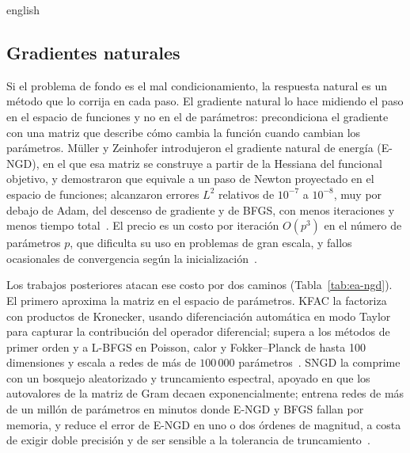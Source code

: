 \documentclass[../0000.tex]{subfiles}
\begin{document}
\begin{hyphenrules}{english}
\subsection{Gradientes naturales}
\label{subsec:ea-ngd}

Si el problema de fondo es el mal condicionamiento, la respuesta natural es un método que lo corrija en cada paso. El gradiente natural lo hace midiendo el paso en el espacio de funciones y no en el de parámetros: precondiciona el gradiente con una matriz que describe cómo cambia la función cuando cambian los parámetros. Müller y Zeinhofer introdujeron el gradiente natural de energía (E-NGD), en el que esa matriz se construye a partir de la Hessiana del funcional objetivo, y demostraron que equivale a un paso de Newton proyectado en el espacio de funciones; alcanzaron errores $L^2$ relativos de $10^{-7}$ a $10^{-8}$, muy por debajo de Adam, del descenso de gradiente y de BFGS, con menos iteraciones y menos tiempo total~\cite{muller2023achieving}. El precio es un costo por iteración $O(p^3)$ en el número de parámetros $p$, que dificulta su uso en problemas de gran escala, y fallos ocasionales de convergencia según la inicialización~\cite{muller2023achieving}.

Los trabajos posteriores atacan ese costo por dos caminos (Tabla~\ref{tab:ea-ngd}). El primero aproxima la matriz en el espacio de parámetros. KFAC la factoriza con productos de Kronecker, usando diferenciación automática en modo Taylor para capturar la contribución del operador diferencial; supera a los métodos de primer orden y a L-BFGS en Poisson, calor y Fokker--Planck de hasta 100 dimensiones y escala a redes de más de $100\,000$ parámetros~\cite{dangel2024kronecker}. SNGD la comprime con un bosquejo aleatorizado y truncamiento espectral, apoyado en que los autovalores de la matriz de Gram decaen exponencialmente; entrena redes de más de un millón de parámetros en minutos donde E-NGD y BFGS fallan por memoria, y reduce el error de E-NGD en uno o dos órdenes de magnitud, a costa de exigir doble precisión y de ser sensible a la tolerancia de truncamiento~\cite{mckay2025near}.


\end{hyphenrules}
\end{document}
